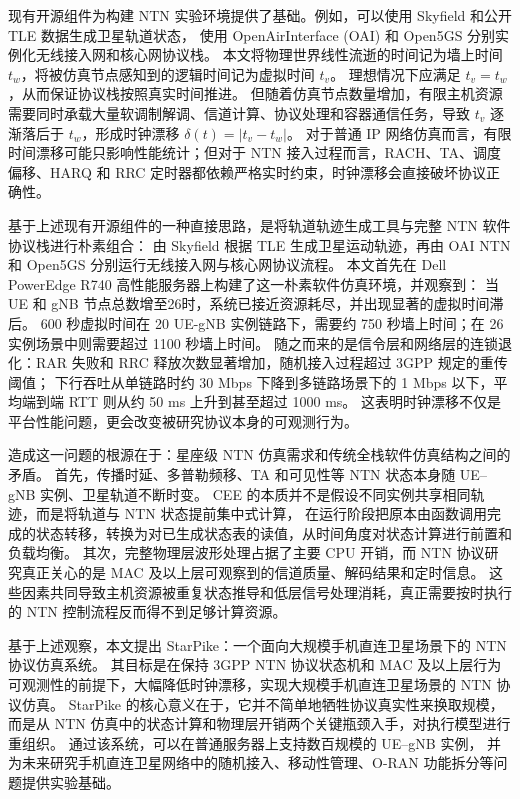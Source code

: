 
现有开源组件为构建 NTN 实验环境提供了基础。例如，可以使用 Skyfield 和公开 TLE 数据生成卫星轨道状态\cite{skyfield,celestrak}，
使用 OpenAirInterface (OAI) 和 Open5GS 分别实例化无线接入网和核心网协议栈\cite{oai,open5gs}。
本文将物理世界线性流逝的时间记为墙上时间 $t_w$，将被仿真节点感知到的逻辑时间记为虚拟时间 $t_v$。
理想情况下应满足 $t_v = t_w$，从而保证协议栈按照真实时间推进。
但随着仿真节点数量增加，有限主机资源需要同时承载大量软调制解调、信道计算、协议处理和容器通信任务，导致 $t_v$ 逐渐落后于 $t_w$，形成时钟漂移 $\delta(t)=|t_v-t_w|$。
对于普通 IP 网络仿真而言，有限时间漂移可能只影响性能统计；但对于 NTN 接入过程而言，RACH、TA、调度偏移、HARQ 和 RRC 定时器都依赖严格实时约束，时钟漂移会直接破坏协议正确性。

基于上述现有开源组件的一种直接思路，是将轨道轨迹生成工具与完整 NTN 软件协议栈进行朴素组合：
由 Skyfield 根据 TLE 生成卫星运动轨迹，再由 OAI NTN 和 Open5GS 分别运行无线接入网与核心网协议流程。
本文首先在 Dell PowerEdge R740 高性能服务器上构建了这一朴素软件仿真环境，并观察到：
当 UE 和 gNB 节点总数增至26时，系统已接近资源耗尽，并出现显著的虚拟时间滞后。
600 秒虚拟时间在 20 UE-gNB 实例链路下，需要约 750 秒墙上时间；在 26 实例场景中则需要超过 1100 秒墙上时间。
随之而来的是信令层和网络层的连锁退化：RAR 失败和 RRC 释放次数显著增加，随机接入过程超过 3GPP 规定的重传阈值；
下行吞吐从单链路时约 30 Mbps 下降到多链路场景下的 1 Mbps 以下，平均端到端 RTT 则从约 50 ms 上升到甚至超过 1000 ms。
这表明时钟漂移不仅是平台性能问题，更会改变被研究协议本身的可观测行为。

造成这一问题的根源在于：星座级 NTN 仿真需求和传统全栈软件仿真结构之间的矛盾。
首先，传播时延、多普勒频移、TA 和可见性等 NTN 状态本身随 UE--gNB 实例、卫星轨道不断时变。
CEE 的本质并不是假设不同实例共享相同轨迹，而是将轨道与 NTN 状态提前集中式计算，
在运行阶段把原本由函数调用完成的状态转移，转换为对已生成状态表的读值，从时间角度对状态计算进行前置和负载均衡。
其次，完整物理层波形处理占据了主要 CPU 开销，而 NTN 协议研究真正关心的是 MAC 及以上层可观察到的信道质量、解码结果和定时信息。
这些因素共同导致主机资源被重复状态推导和低层信号处理消耗，真正需要按时执行的 NTN 控制流程反而得不到足够计算资源。

基于上述观察，本文提出 StarPike：一个面向大规模手机直连卫星场景下的 NTN 协议仿真系统。
其目标是在保持 3GPP NTN 协议状态机和 MAC 及以上层行为可观测性的前提下，大幅降低时钟漂移，实现大规模手机直连卫星场景的 NTN 协议仿真。
StarPike 的核心意义在于，它并不简单地牺牲协议真实性来换取规模，
而是从 NTN 仿真中的状态计算和物理层开销两个关键瓶颈入手，对执行模型进行重组织。
通过该系统，可以在普通服务器上支持数百规模的 UE--gNB 实例，
并为未来研究手机直连卫星网络中的随机接入、移动性管理、O-RAN 功能拆分等问题提供实验基础。

